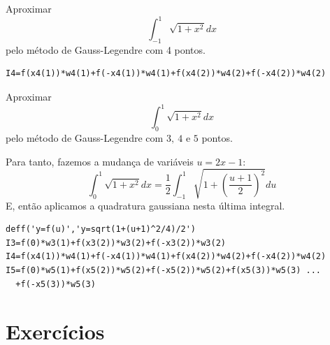 \ifisscilab
\begin{ex} Aproximar
$$\int_{-1}^1\sqrt{1+x^2}dx$$
pelo método de Gauss-Legendre com 4 pontos.
\end{ex}
\begin{sol}
\begin{verbatim}
I4=f(x4(1))*w4(1)+f(-x4(1))*w4(1)+f(x4(2))*w4(2)+f(-x4(2))*w4(2)
\end{verbatim}  
\end{sol}
\fi


\begin{ex} Aproximar
$$\int_{0}^1\sqrt{1+x^2}dx$$
pelo método de Gauss-Legendre com $3,\ 4$ e $5$ pontos.
\end{ex}
\begin{sol}
Para tanto, fazemos a mudança de variáveis $u=2x-1$:
\begin{equation*}
  \int_{0}^1\sqrt{1+x^2}dx=\frac{1}{2}\int_{-1}^1\sqrt{1+\left(\frac{u+1}{2}\right)^2}du
\end{equation*}
E, então aplicamos a quadratura gaussiana nesta última integral.
\ifisscilab
\begin{verbatim}
deff('y=f(u)','y=sqrt(1+(u+1)^2/4)/2')
I3=f(0)*w3(1)+f(x3(2))*w3(2)+f(-x3(2))*w3(2)
I4=f(x4(1))*w4(1)+f(-x4(1))*w4(1)+f(x4(2))*w4(2)+f(-x4(2))*w4(2)
I5=f(0)*w5(1)+f(x5(2))*w5(2)+f(-x5(2))*w5(2)+f(x5(3))*w5(3) ...
  +f(-x5(3))*w5(3)
\end{verbatim}
\fi  
\end{sol}

\section*{Exercícios}


